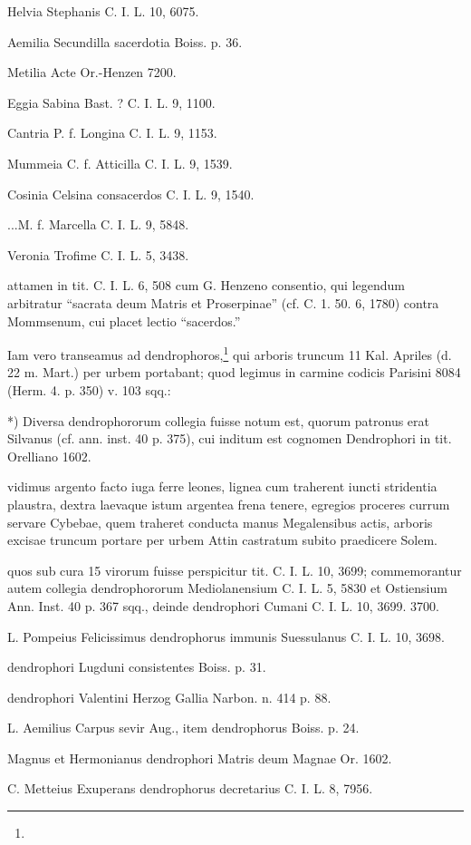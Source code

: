 \documentclass[a4paper, 11pt, oneside, polutonikogreek, german]{article}
\begin{document}
Helvia Stephanis C. I. L. 10, 6075.

Aemilia Secundilla sacerdotia Boiss. p. 36.

Metilia Acte Or.-Henzen 7200.

Eggia Sabina Bast. ? C. I. L. 9, 1100.

Cantria P. f. Longina C. I. L. 9, 1153.

Mummeia C. f. Atticilla C. I. L. 9, 1539.

Cosinia Celsina consacerdos C. I. L. 9, 1540.

...M. f. Marcella C. I. L. 9, 5848.

Veronia Trofime C. I. L. 5, 3438.

attamen in tit. C. I. L. 6, 508 cum G. Henzeno consentio, qui legendum arbitratur "`sacrata deum Matris et Proserpinae"' (cf. C. 1. 50. 6, 1780) contra Mommsenum, cui placet lectio "`sacerdos."'

Iam vero transeamus ad dendrophoros,\footnote{} qui arboris truncum 11 Kal. Apriles (d. 22 m. Mart.) per urbem portabant; quod legimus in carmine codicis Parisini 8084 (Herm. 4. p. 350) v. 103 sqq.:

*) Diversa dendrophororum collegia fuisse notum est, quorum patronus erat Silvanus (cf. ann. inst. 40 p. 375), cui inditum est cognomen Dendrophori in tit. Orelliano 1602.

vidimus argento facto iuga ferre leones,  lignea cum traherent iuncti stridentia plaustra,  dextra laevaque istum argentea frena tenere,  egregios proceres currum servare Cybebae,  quem traheret conducta manus Megalensibus actis,  arboris excisae truncum portare per urbem  Attin castratum subito praedicere Solem.

quos sub cura 15 virorum fuisse perspicitur tit. C. I. L. 10, 3699; commemorantur autem collegia dendrophororum Mediolanensium C. I. L. 5, 5830 et Ostiensium Ann. Inst. 40 p. 367 sqq., deinde dendrophori Cumani C. I. L. 10, 3699. 3700.

L. Pompeius Felicissimus dendrophorus immunis Suessulanus C. I. L. 10, 3698.

dendrophori Lugduni consistentes Boiss. p. 31.

dendrophori Valentini Herzog Gallia Narbon. n. 414 p. 88.

L. Aemilius Carpus sevir Aug., item dendrophorus Boiss. p. 24.

Magnus et Hermonianus dendrophori Matris deum Magnae Or. 1602.

C. Metteius Exuperans dendrophorus decretarius C. I. L. 8, 7956.
\end{document}
